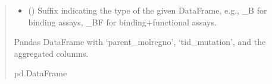 \documentclass[letterpaper,10pt,english]{sphinxmanual}
\begin{document}
\begin{fulllineitems}
\begin{quote}
\begin{description}
\begin{itemize}
\item {} 
\sphinxAtStartPar
{} () \textendash{} Suffix indicating the type of the given DataFrame,
e.g., \_B for binding assays, \_BF for binding+functional assays.

\end{itemize}

\sphinxAtStartPar
Pandas DataFrame with ‘parent\_molregno’, ‘tid\_mutation’, and the aggregated columns.

\sphinxAtStartPar
pd.DataFrame

\end{description}\end{quote}

\end{fulllineitems}

\end{document}
